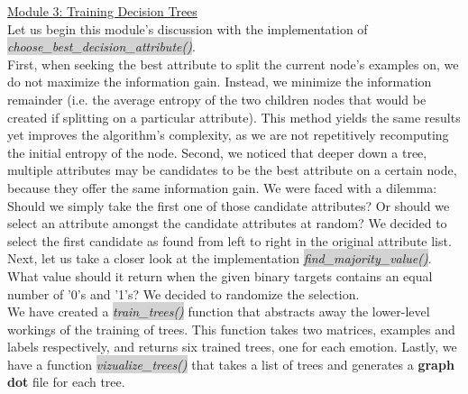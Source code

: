 {{\underline{Module 3: Training Decision Trees} \\
Let us begin this module's discussion with the implementation of  \colorbox{lightgray}{\emph{choose\_best\_decision\_attribute()}}. \\
First, when seeking the best attribute to split the current node's examples on, we do not maximize the information gain.
Instead, we minimize the information remainder (i.e. the average entropy of the two children nodes
that would be created if splitting on a particular attribute).
This method yields the same results yet improves the algorithm's complexity,
as we are not repetitively recomputing the initial entropy of the node.
Second, we noticed that deeper down a tree, multiple attributes may be candidates to be the best attribute on a certain node,
because they offer the same information gain. We were faced with a dilemma: Should we simply
take the first one of those candidate attributes? Or should we select an attribute amongst the candidate attributes at random?
We decided to select the first candidate as found from left to right in the original attribute list.\\
Next, let us take a closer look at the implementation  \colorbox{lightgray}{\emph{find\_majority\_value()}}.\\
What value should it return when the given binary targets contains an equal number of
'0's and '1's? We decided to randomize the selection.\\
We have created a  \colorbox{lightgray}{\emph{train\_trees()}} function that abstracts away the lower-level workings of the training
of trees. This function takes two matrices, examples and labels respectively,
and returns six trained trees, one for each emotion.
Lastly, we have a function  \colorbox{lightgray}{\emph{vizualize\_trees()}} that takes a list of trees and generates a \textbf{graph dot} file
for each tree.

}}
